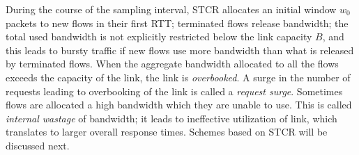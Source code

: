 \documentclass[conference]{../../IEEEtran}
\begin{document}









\par During the course of the sampling interval, STCR allocates an initial window $w_0$ packets to new flows in their first RTT; terminated flows release bandwidth; the total used bandwidth is not explicitly restricted below the link capacity $B$, and this leads to bursty traffic if new flows use more bandwidth than what is released by terminated flows.  When the aggregate bandwidth allocated to all the flows exceeds the capacity of the link, the link is \emph{overbooked}. A surge in the number of requests leading to overbooking of the link is called a \emph{request surge}. Sometimes flows are allocated a high bandwidth which they are unable to use. This is called \emph{internal wastage} of bandwidth; it leads to ineffective utilization of link, which translates to larger overall response times. Schemes based on STCR will be discussed next.
\end{document}
